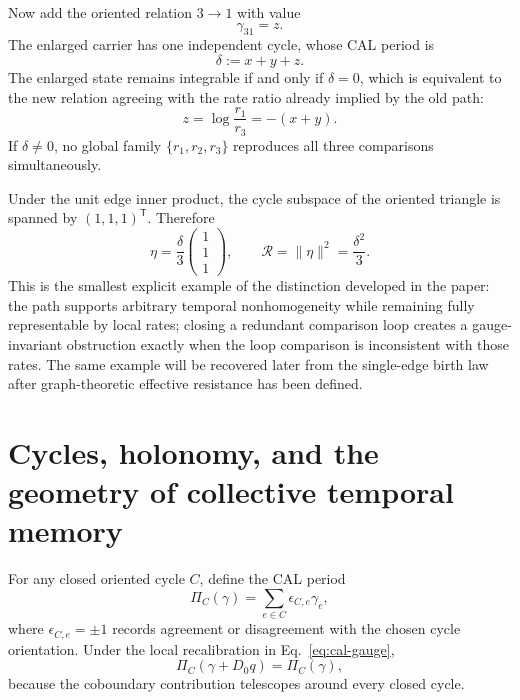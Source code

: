 \documentclass[aip,jmp,amsmath,amssymb,reprint]{revtex4-2}
\newcommand{\Rcal}{\mathcal{R}}
\begin{document}
Now add the oriented relation $3\to1$ with value
\begin{equation}
\gamma_{31}=z.
\end{equation}
The enlarged carrier has one independent cycle, whose CAL period is
\begin{equation}
\delta:=x+y+z.
\label{eq:triangle-defect}
\end{equation}
The enlarged state remains integrable if and only if $\delta=0$, which is equivalent to the new relation agreeing with the rate ratio already implied by the old path:
\begin{equation}
z=\log\frac{r_1}{r_3}=-(x+y).
\end{equation}
If $\delta\neq0$, no global family $\{r_1,r_2,r_3\}$ reproduces all three comparisons simultaneously.

Under the unit edge inner product, the cycle subspace of the oriented triangle is spanned by $(1,1,1)^{\mathsf T}$. Therefore
\begin{equation}
\eta=\frac{\delta}{3}
\begin{pmatrix}
1\\1\\1
\end{pmatrix},
\qquad
\Rcal=\|\eta\|^2=\frac{\delta^2}{3}.
\label{eq:triangle-R}
\end{equation}
This is the smallest explicit example of the distinction developed in the paper: the path supports arbitrary temporal nonhomogeneity while remaining fully representable by local rates; closing a redundant comparison loop creates a gauge-invariant obstruction exactly when the loop comparison is inconsistent with those rates. The same example will be recovered later from the single-edge birth law after graph-theoretic effective resistance has been defined.

\section{Cycles, holonomy, and the geometry of collective temporal memory}\label{sec:memory}

For any closed oriented cycle $C$, define the CAL period
\begin{equation}
\Pi_C(\gamma)=\sum_{e\in C}\epsilon_{C,e}\gamma_e,
\label{eq:cycle-period}
\end{equation}
where $\epsilon_{C,e}=\pm1$ records agreement or disagreement with the chosen cycle orientation. Under the local recalibration in Eq.~\eqref{eq:cal-gauge},
\begin{equation}
\Pi_C(\gamma+D_0q)=\Pi_C(\gamma),
\end{equation}
because the coboundary contribution telescopes around every closed cycle.
\end{document}
